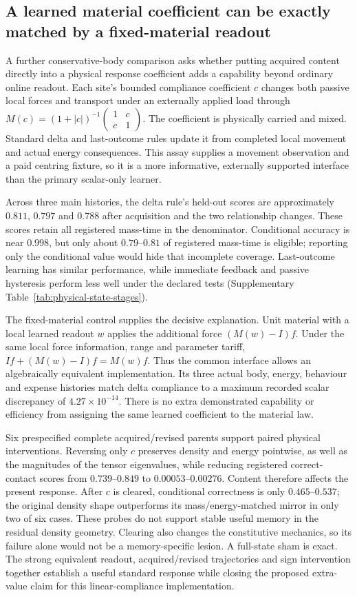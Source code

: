 \subsection*{A learned material coefficient can be exactly matched by a fixed-material readout}

A further conservative-body comparison asks whether putting acquired content directly into a physical response coefficient adds a capability beyond ordinary online readout. Each site's bounded compliance coefficient $c$ changes both passive local forces and transport under an externally applied load through $M(c)=(1+|c|)^{-1}\left(\begin{smallmatrix}1&c\\c&1\end{smallmatrix}\right)$. The coefficient is physically carried and mixed. Standard delta and last-outcome rules update it from completed local movement and actual energy consequences. This assay supplies a movement observation and a paid centring fixture, so it is a more informative, externally supported interface than the primary scalar-only learner.

Across three main histories, the delta rule's held-out scores are approximately $0.811$, $0.797$ and $0.788$ after acquisition and the two relationship changes. These scores retain all registered mass-time in the denominator. Conditional accuracy is near $0.998$, but only about $0.79$--$0.81$ of registered mass-time is eligible; reporting only the conditional value would hide that incomplete coverage. Last-outcome learning has similar performance, while immediate feedback and passive hysteresis perform less well under the declared tests (Supplementary Table~\ref{tab:physical-state-stages}).

The fixed-material control supplies the decisive explanation. Unit material with a local learned readout $w$ applies the additional force $(M(w)-I)f$. Under the same local force information, range and parameter tariff, $If+(M(w)-I)f=M(w)f$. Thus the common interface allows an algebraically equivalent implementation. Its three actual body, energy, behaviour and expense histories match delta compliance to a maximum recorded scalar discrepancy of $4.27\times10^{-14}$. There is no extra demonstrated capability or efficiency from assigning the same learned coefficient to the material law.

Six prespecified complete acquired/revised parents support paired physical interventions. Reversing only $c$ preserves density and energy pointwise, as well as the magnitudes of the tensor eigenvalues, while reducing registered correct-contact scores from $0.739$--$0.849$ to $0.00053$--$0.00276$. Content therefore affects the present response. After $c$ is cleared, conditional correctness is only $0.465$--$0.537$; the original density shape outperforms its mass/energy-matched mirror in only two of six cases. These probes do not support stable useful memory in the residual density geometry. Clearing also changes the constitutive mechanics, so its failure alone would not be a memory-specific lesion. A full-state sham is exact. The strong equivalent readout, acquired/revised trajectories and sign intervention together establish a useful standard response while closing the proposed extra-value claim for this linear-compliance implementation.
